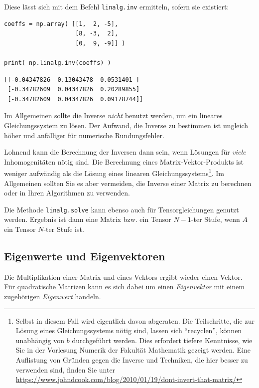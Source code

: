 Diese lässt sich mit dem Befehl \texttt{linalg.inv} ermitteln, sofern sie existiert:

\begin{codebox}
\begin{verbatim}
coeffs = np.array( [[1,  2, -5],
                    [8, -3,  2],
                    [0,  9, -9]] )

print( np.linalg.inv(coeffs) )
\end{verbatim}
\end{codebox}
%
\begin{cmdbox}
\begin{verbatim}
[[-0.04347826  0.13043478  0.0531401 ]
 [-0.34782609  0.04347826  0.20289855]
 [-0.34782609  0.04347826  0.09178744]]
\end{verbatim}
\end{cmdbox}

\begin{warnbox}
Im Allgemeinen sollte die Inverse \emph{nicht} benutzt werden, um ein lineares Gleichungssystem zu lösen. Der Aufwand, die Inverse zu bestimmen ist ungleich höher und anfälliger für numerische Rundungsfehler.

Lohnend kann die Berechnung der Inversen dann sein, wenn Lösungen für \emph{viele} Inhomogenitäten nötig sind. Die Berechnung eines Matrix-Vektor-Produkts ist weniger aufwändig als die Lösung eines linearen Gleichungssystems\footnote{Selbst in diesem Fall wird eigentlich davon abgeraten. Die Teilschritte, die zur Lösung eines Gleichungssystems nötig sind, lassen sich \enquote{recyclen}, \ie können unabhängig von $b$ durchgeführt werden. Dies erfordert tiefere Kenntnisse, wie Sie in der Vorlesung Numerik der Fakultät Mathematik gezeigt werden. Eine Auflistung von Gründen gegen die Inverse und Techniken, die hier besser zu verwenden sind, finden Sie unter \url{https://www.johndcook.com/blog/2010/01/19/dont-invert-that-matrix/}}. Im Allgemeinen sollten Sie es aber vermeiden, die Inverse einer Matrix zu berechnen oder in Ihren Algorithmen zu verwenden.
\end{warnbox}

Die Methode \texttt{linalg.solve} kann ebenso auch für Tensorgleichungen genutzt werden. Ergebnis ist dann eine Matrix bzw. ein Tensor $N-1$-ter Stufe, wenn $A$ ein Tensor $N$-ter Stufe ist.

\subsection{Eigenwerte und Eigenvektoren}
Die Multiplikation einer Matrix und eines Vektors ergibt wieder einen Vektor. Für quadratische Matrizen kann es sich dabei um einen \emph{Eigenvektor} mit einem zugehörigen \emph{Eigenwert} handeln.

